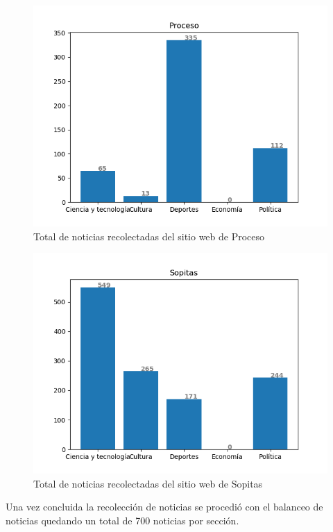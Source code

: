 \begin{figure}[H]
	\centering
	\includegraphics[scale=.45]{imagenes/Capitulo5/proceso.png}
	\caption{Total de noticias recolectadas del sitio web de Proceso}
	\label{Fig:notsitioproceso}
\end{figure}

\begin{figure}[H]
	\centering
	\includegraphics[scale=.45]{imagenes/Capitulo5/sopitas.png}
	\caption{Total de noticias recolectadas del sitio web de Sopitas}
	\label{Fig:notsitiosopitas}
\end{figure}

Una vez concluida la recolección de noticias se procedió con el balanceo de noticias quedando un total de 700 noticias por sección.